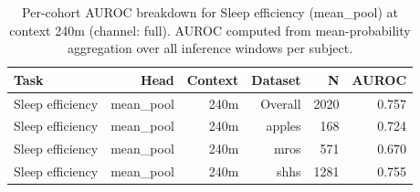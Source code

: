\begin{table}[ht]
\centering
\caption{Per-cohort AUROC breakdown for Sleep efficiency (mean_pool) at context 240m (channel: full). AUROC computed from mean-probability aggregation over all inference windows per subject.}
\label{tab:cohort_sleep_efficiency_binary_mean_pool_full}
\begin{tabular}{lrrrrr}
\toprule
Task & Head & Context & Dataset & N & AUROC \\
\midrule
Sleep efficiency & mean_pool & 240m & Overall & 2020 & 0.757 \\
Sleep efficiency & mean_pool & 240m & apples & 168 & 0.724 \\
Sleep efficiency & mean_pool & 240m & mros & 571 & 0.670 \\
Sleep efficiency & mean_pool & 240m & shhs & 1281 & 0.755 \\
\bottomrule
\end{tabular}
\end{table}